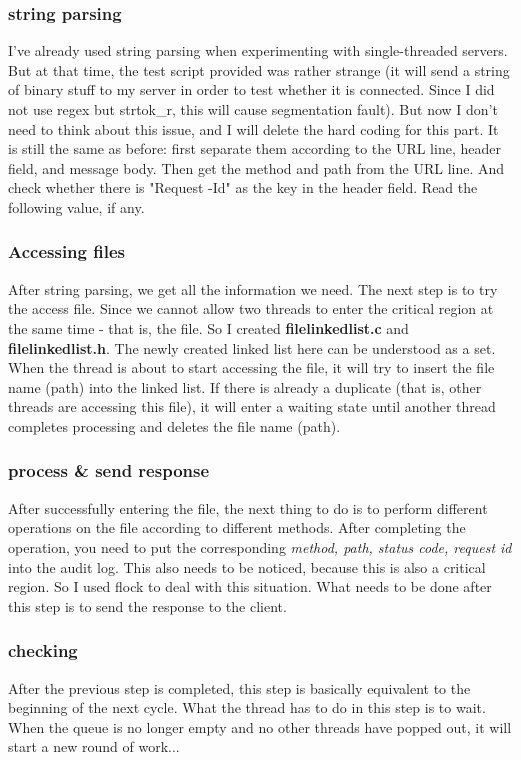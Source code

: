 \documentclass{article}
\begin{document}
        \subsubsection{string parsing}
            I've already used string parsing when experimenting with single-threaded servers. But at that time, the test script provided was rather strange (it will send a string of binary stuff to my server in order to test whether it is connected. Since I did not use regex but strtok\_r, this will cause segmentation fault). But now I don't need to think about this issue, and I will delete the hard coding for this part. It is still the same as before: first separate them according to the URL line, header field, and message body. Then get the method and path from the URL line. And check whether there is "Request -Id" as the key in the header field. Read the following value, if any.
        \subsubsection{Accessing files}
            After string parsing, we get all the information we need. The next step is to try the access file. Since we cannot allow two threads to enter the critical region at the same time - that is, the file. So I created \textbf{filelinkedlist.c} and \textbf{filelinkedlist.h}. The newly created linked list here can be understood as a set. When the thread is about to start accessing the file, it will try to insert the file name (path) into the linked list. If there is already a duplicate (that is, other threads are accessing this file), it will enter a waiting state until another thread completes processing and deletes the file name (path).
        \subsubsection{process \& send response}
            After successfully entering the file, the next thing to do is to perform different operations on the file according to different methods. After completing the operation, you need to put the corresponding \textit{method, path, status code, request id} into the audit log. This also needs to be noticed, because this is also a critical region. So I used flock to deal with this situation. What needs to be done after this step is to send the response to the client.
        \subsubsection{checking}
            After the previous step is completed, this step is basically equivalent to the beginning of the next cycle. What the thread has to do in this step is to wait. When the queue is no longer empty and no other threads have popped out, it will start a new round of work...
\end{document}
